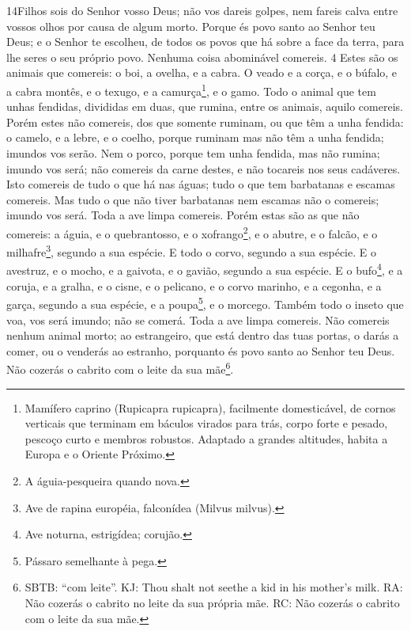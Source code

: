 \lettrine{14} Filhos sois do Senhor vosso Deus; não vos dareis
golpes, nem fareis calva entre vossos olhos por causa de algum
morto. Porque és povo santo ao Senhor teu Deus; e o Senhor te
escolheu, de todos os povos que há sobre a face da terra, para lhe
seres o seu próprio povo. Nenhuma coisa abominável comereis. 4
Estes são os animais que comereis: o boi, a ovelha, e a cabra. O
veado e a corça, e o búfalo, e a cabra montês, e o texugo, e a
camurça\footnote{Mamífero caprino (Rupicapra rupicapra), facilmente
domesticável, de cornos verticais que terminam em báculos virados
para trás, corpo forte e pesado, pescoço curto e membros robustos.
Adaptado a grandes altitudes, habita a Europa e o Oriente Próximo.},
e o gamo. Todo o animal que tem unhas fendidas, divididas em
duas, que rumina, entre os animais, aquilo comereis. Porém estes
não comereis, dos que somente ruminam, ou que têm a unha fendida: o
camelo, e a lebre, e o coelho, porque ruminam mas não têm a unha
fendida; imundos vos serão. Nem o porco, porque tem unha
fendida, mas não rumina; imundo vos será; não comereis da carne
destes, e não tocareis nos seus cadáveres. Isto comereis de tudo
o que há nas águas; tudo o que tem barbatanas e escamas comereis.
Mas tudo o que não tiver barbatanas nem escamas não o
comereis; imundo vos será. Toda a ave limpa comereis.
Porém estas são as que não comereis: a águia, e o
quebrantosso, e o xofrango\footnote{A águia-pesqueira quando nova.},
e o abutre, e o falcão, e o milhafre\footnote{Ave de rapina
européia, falconídea (Milvus milvus).}, segundo a sua espécie.
E todo o corvo, segundo a sua espécie. E o avestruz, e
o mocho, e a gaivota, e o gavião, segundo a sua espécie. E o
bufo\footnote{Ave noturna, estrigídea; corujão.}, e a coruja, e a
gralha, e o cisne, e o pelicano, e o corvo marinho, e
a cegonha, e a garça, segundo a sua espécie, e a
poupa\footnote{Pássaro semelhante à pega.}, e o morcego.
Também todo o inseto que voa, vos será imundo; não se comerá.
Toda a ave limpa comereis. Não comereis nenhum animal
morto; ao estrangeiro, que está dentro das tuas portas, o darás a
comer, ou o venderás ao estranho, porquanto és povo santo ao Senhor
teu Deus. Não cozerás o cabrito com o leite da sua
mãe\footnote{SBTB: ``com leite''. KJ: Thou shalt not seethe a kid in
his mother's milk. RA: Não cozerás o cabrito no leite da sua própria
mãe. RC: Não cozerás o cabrito com o leite da sua mãe.}.

